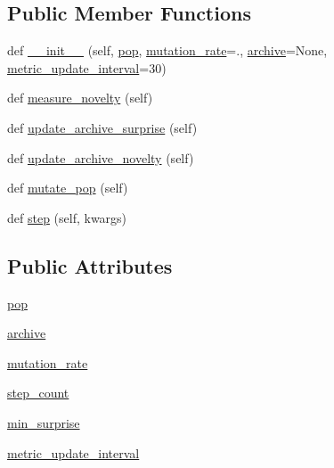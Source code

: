\subsection*{Public Member Functions}
\begin{DoxyCompactItemize}
\item 
def \hyperlink{classtaxons_1_1core_1_1utils_1_1optimizer_1_1_base_optimizer_af572aca4ea4e40ded6fb4f3c58900d12}{\+\_\+\+\_\+init\+\_\+\+\_\+} (self, \hyperlink{classtaxons_1_1core_1_1utils_1_1optimizer_1_1_base_optimizer_a213838c61093bc7961599d3136c82684}{pop}, \hyperlink{classtaxons_1_1core_1_1utils_1_1optimizer_1_1_base_optimizer_ab51af6ad9db1fb2bacc2cae83af7ebc3}{mutation\+\_\+rate}=., \hyperlink{classtaxons_1_1core_1_1utils_1_1optimizer_1_1_base_optimizer_a7e90d0bae2521b4b6294ecf4eeda08f6}{archive}=None, \hyperlink{classtaxons_1_1core_1_1utils_1_1optimizer_1_1_base_optimizer_a2c9d6c07d6bd3d950a772d6c8c95d598}{metric\+\_\+update\+\_\+interval}=30)
\item 
def \hyperlink{classtaxons_1_1core_1_1utils_1_1optimizer_1_1_base_optimizer_a484eac95056cc6e43c928f13c963fcc6}{measure\+\_\+novelty} (self)
\item 
def \hyperlink{classtaxons_1_1core_1_1utils_1_1optimizer_1_1_base_optimizer_abb720648f9a32923ad034b97402abb3e}{update\+\_\+archive\+\_\+surprise} (self)
\item 
def \hyperlink{classtaxons_1_1core_1_1utils_1_1optimizer_1_1_base_optimizer_af0db4b11b21126b81619eee2e9a15ec2}{update\+\_\+archive\+\_\+novelty} (self)
\item 
def \hyperlink{classtaxons_1_1core_1_1utils_1_1optimizer_1_1_base_optimizer_a1e737beddb5a4e32ae7997cf4e009578}{mutate\+\_\+pop} (self)
\item 
def \hyperlink{classtaxons_1_1core_1_1utils_1_1optimizer_1_1_base_optimizer_aeb8d423e1015ea6e4bbdce3858be725a}{step} (self, kwargs)
\end{DoxyCompactItemize}
\subsection*{Public Attributes}
\begin{DoxyCompactItemize}
\item 
\hyperlink{classtaxons_1_1core_1_1utils_1_1optimizer_1_1_base_optimizer_a213838c61093bc7961599d3136c82684}{pop}
\item 
\hyperlink{classtaxons_1_1core_1_1utils_1_1optimizer_1_1_base_optimizer_a7e90d0bae2521b4b6294ecf4eeda08f6}{archive}
\item 
\hyperlink{classtaxons_1_1core_1_1utils_1_1optimizer_1_1_base_optimizer_ab51af6ad9db1fb2bacc2cae83af7ebc3}{mutation\+\_\+rate}
\item 
\hyperlink{classtaxons_1_1core_1_1utils_1_1optimizer_1_1_base_optimizer_af7d28357ce4633edc303e4880b569edb}{step\+\_\+count}
\item 
\hyperlink{classtaxons_1_1core_1_1utils_1_1optimizer_1_1_base_optimizer_a0e0d70c92c506ce72ccd3d99d1fd789b}{min\+\_\+surprise}
\item 
\hyperlink{classtaxons_1_1core_1_1utils_1_1optimizer_1_1_base_optimizer_a2c9d6c07d6bd3d950a772d6c8c95d598}{metric\+\_\+update\+\_\+interval}
\end{DoxyCompactItemize}


